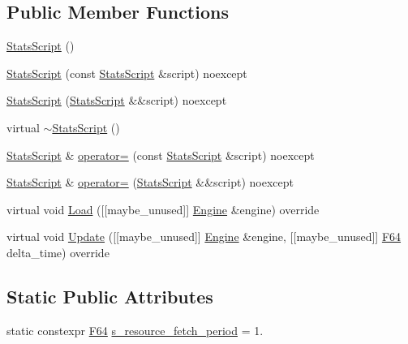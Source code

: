 \subsection*{Public Member Functions}
\begin{DoxyCompactItemize}
\item 
\hyperlink{classmage_1_1script_1_1_stats_script_a6863940cb48633fbd5fc56547dc72a76}{Stats\+Script} ()
\item 
\hyperlink{classmage_1_1script_1_1_stats_script_a3fb4aa69fc341df0fe2c2ad03f0ff278}{Stats\+Script} (const \hyperlink{classmage_1_1script_1_1_stats_script}{Stats\+Script} \&script) noexcept
\item 
\hyperlink{classmage_1_1script_1_1_stats_script_a9ac8ca59744a668504010b0f496f266f}{Stats\+Script} (\hyperlink{classmage_1_1script_1_1_stats_script}{Stats\+Script} \&\&script) noexcept
\item 
virtual \hyperlink{classmage_1_1script_1_1_stats_script_a5b9b30aa6939968c2aee8cdf11f6486c}{$\sim$\+Stats\+Script} ()
\item 
\hyperlink{classmage_1_1script_1_1_stats_script}{Stats\+Script} \& \hyperlink{classmage_1_1script_1_1_stats_script_a538428ec1763e0fb4b41839e7943ca56}{operator=} (const \hyperlink{classmage_1_1script_1_1_stats_script}{Stats\+Script} \&script) noexcept
\item 
\hyperlink{classmage_1_1script_1_1_stats_script}{Stats\+Script} \& \hyperlink{classmage_1_1script_1_1_stats_script_ae99dbfbff061fcc916c968d670a1e481}{operator=} (\hyperlink{classmage_1_1script_1_1_stats_script}{Stats\+Script} \&\&script) noexcept
\item 
virtual void \hyperlink{classmage_1_1script_1_1_stats_script_a4bfada754da5ca76591c5e7b9b0b1f51}{Load} (\mbox{[}\mbox{[}maybe\+\_\+unused\mbox{]}\mbox{]} \hyperlink{classmage_1_1_engine}{Engine} \&engine) override
\item 
virtual void \hyperlink{classmage_1_1script_1_1_stats_script_a2a98901197fc1681103c5aa0fb3f11f4}{Update} (\mbox{[}\mbox{[}maybe\+\_\+unused\mbox{]}\mbox{]} \hyperlink{classmage_1_1_engine}{Engine} \&engine, \mbox{[}\mbox{[}maybe\+\_\+unused\mbox{]}\mbox{]} \hyperlink{namespacemage_ad26233bbec640deda836e572c1a23708}{F64} delta\+\_\+time) override
\end{DoxyCompactItemize}
\subsection*{Static Public Attributes}
\begin{DoxyCompactItemize}
\item 
static constexpr \hyperlink{namespacemage_ad26233bbec640deda836e572c1a23708}{F64} \hyperlink{classmage_1_1script_1_1_stats_script_adad03ab9bd20bde0709365d43a4158fd}{s\+\_\+resource\+\_\+fetch\+\_\+period} = 1.
\end{DoxyCompactItemize}
